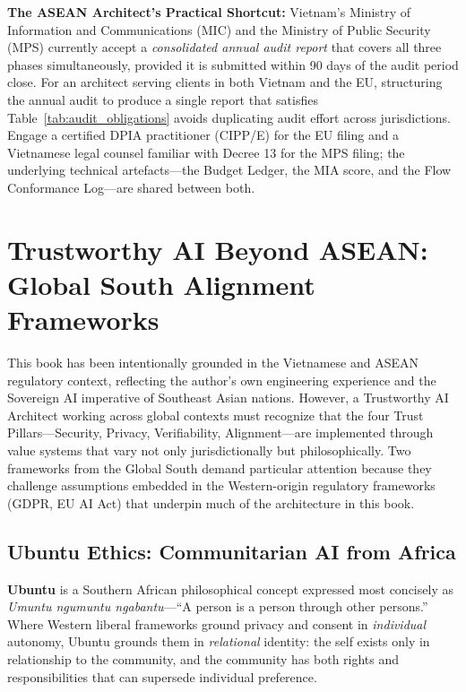 \begin{svgraybox}
\textbf{The ASEAN Architect's Practical Shortcut:} Vietnam's Ministry of Information and Communications (MIC) and the Ministry of Public Security (MPS) currently accept a \emph{consolidated annual audit report} that covers all three phases simultaneously, provided it is submitted within 90 days of the audit period close. For an architect serving clients in both Vietnam and the EU, structuring the annual audit to produce a single report that satisfies Table~\ref{tab:audit_obligations} avoids duplicating audit effort across jurisdictions. Engage a certified DPIA practitioner (CIPP/E) for the EU filing and a Vietnamese legal counsel familiar with Decree 13 for the MPS filing; the underlying technical artefacts---the Budget Ledger, the MIA score, and the Flow Conformance Log---are shared between both.
\end{svgraybox}

\section{Trustworthy AI Beyond ASEAN: Global South Alignment Frameworks}
\label{sec:global_south}

This book has been intentionally grounded in the Vietnamese and ASEAN regulatory context, reflecting the author's own engineering experience and the Sovereign AI imperative of Southeast Asian nations. However, a Trustworthy AI Architect working across global contexts must recognize that the four Trust Pillars---Security, Privacy, Verifiability, Alignment---are implemented through value systems that vary not only jurisdictionally but philosophically. Two frameworks from the Global South demand particular attention because they challenge assumptions embedded in the Western-origin regulatory frameworks (GDPR, EU AI Act) that underpin much of the architecture in this book.

\subsection{Ubuntu Ethics: Communitarian AI from Africa}
\label{subsec:ubuntu_ethics}

\textbf{Ubuntu} is a Southern African philosophical concept expressed most concisely as \textit{Umuntu ngumuntu ngabantu}---``A person is a person through other persons.'' Where Western liberal frameworks ground privacy and consent in \emph{individual} autonomy, Ubuntu grounds them in \emph{relational} identity: the self exists only in relationship to the community, and the community has both rights and responsibilities that can supersede individual preference.

